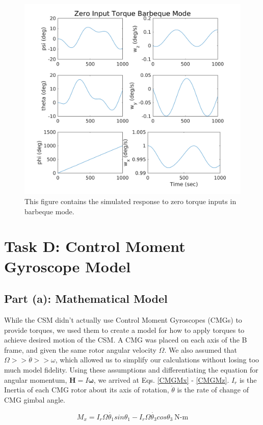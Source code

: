 \documentclass{article}
\begin{document}
\begin{figure}[H]
  \includegraphics[width=\linewidth]{zero_torque_bbq_mode.png}
  \caption{This figure contains the simulated response to zero torque inputs in barbeque mode.}
  \label{fig:zero_torque}
\end{figure}

\section{Task D: Control Moment Gyroscope Model}
\subsection{Part (a): Mathematical Model}
While the CSM didn't actually use Control Moment Gyroscopes (CMGs) to provide torques, we used them to create a model for how to apply torques to achieve desired motion of the CSM. A CMG was placed on each axis of the B frame, and given the same rotor  angular velocity $\Omega$. We also assumed that $\Omega >> \dot{\theta} >> \omega$, which allowed us to simplify our calculations without losing too much model fidelity. Using these assumptions and differentiating the equation for angular momentum, $\mathbf{H} = I \mathbf{\omega}$, we arrived at Eqs. \ref{CMGMx} - \ref{CMGMz}. $I_r$ is the Inertia of each CMG rotor about its axis of rotation, $\dot{\theta}$ is the rate of change of CMG gimbal angle. 

\begin{equation}\label{CMGMx}
    M_x = I_r\Omega \dot{\theta_1} sin{\theta_1} - I_r\Omega \dot{\theta_3} cos{\theta_3} \:\text{N-m}
\end{equation}
\end{document}
